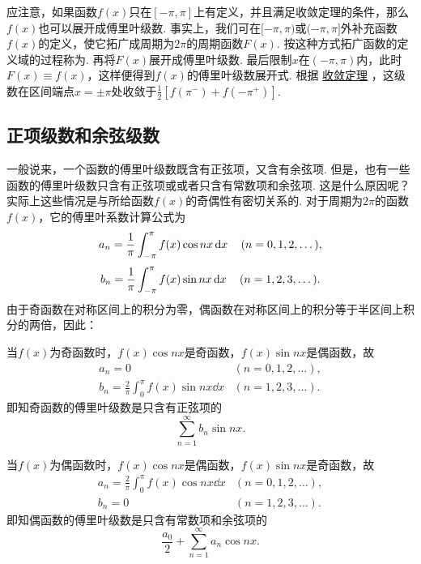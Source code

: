 应注意，如果函数\(f(x)\)只在\([-\pi,\pi]\)上有定义，并且满足收敛定理的条件，那么\(f(x)\)也可以展开成傅里叶级数.
事实上，我们可在\([-\pi,\pi)\)或\((-\pi,\pi]\)外补充函数\(f(x)\)的定义，使它拓广成周期为\(2\pi\)的周期函数\(F(x)\).
按这种方式拓广函数的定义域的过程称为.
再将\(F(x)\)展开成傅里叶级数.
最后限制\(x\)在\((-\pi,\pi)\)内，此时\(F(x) \equiv f(x)\)，这样便得到\(f(x)\)的傅里叶级数展开式.
根据 \hyperref[theorem:无穷级数.傅里叶级数收敛的狄利克雷充分条件]{收敛定理} ，这级数在区间端点\(x=\pm\pi\)处收敛于\(\frac{1}{2} [f(\pi^-) + f(-\pi^+)]\).

\subsection{正项级数和余弦级数}
一般说来，一个函数的傅里叶级数既含有正弦项，又含有余弦项.
但是，也有一些函数的傅里叶级数只含有正弦项或或者只含有常数项和余弦项.
这是什么原因呢？实际上这些情况是与所给函数\(f(x)\)的奇偶性有密切关系的.
对于周期为\(2\pi\)的函数\(f(x)\)，它的傅里叶系数计算公式为\[
a_n = \frac{1}{\pi} \int_{-\pi}^{\pi} f(x) \cos nx \dd{x} \quad(n=0,1,2,\dotsc),
\]\[
b_n = \frac{1}{\pi} \int_{-\pi}^{\pi} f(x) \sin nx \dd{x} \quad(n=1,2,3,\dotsc).
\]
由于奇函数在对称区间上的积分为零，偶函数在对称区间上的积分等于半区间上积分的两倍，因此：

当\(f(x)\)为奇函数时，\(f(x) \cos nx\)是奇函数，\(f(x) \sin nx\)是偶函数，故\[
\begin{array}{ll}
a_n = 0 & (n=0,1,2,\dotsc), \\
b_n = \frac{2}{\pi} \int_0^{\pi} f(x) \sin nx \dd{x} & (n=1,2,3,\dotsc).
\end{array}
\]即知奇函数的傅里叶级数是只含有正弦项的\[
\sum\limits_{n=1}^{\infty} b_n \sin nx.
\]

当\(f(x)\)为偶函数时，\(f(x) \cos nx\)是偶函数，\(f(x) \sin nx\)是奇函数，故\[
\begin{array}{ll}
a_n = \frac{2}{\pi} \int_0^{\pi} f(x) \cos nx \dd{x} & (n=0,1,2,\dotsc), \\
b_n = 0 & (n=1,2,3,\dotsc).
\end{array}
\]即知偶函数的傅里叶级数是只含有常数项和余弦项的\[
\frac{a_0}{2} + \sum\limits_{n=1}^{\infty} a_n \cos{nx}.
\]

